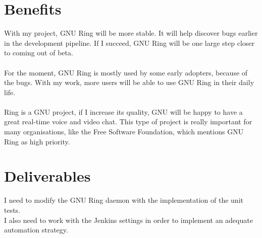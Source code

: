 \documentclass{article}
\begin{document}
\section{Benefits}
With my project, GNU Ring will be more stable. It will help discover bugs earlier in the development pipeline. If I succeed, GNU Ring will be one large step closer to coming out of beta.\\ \\
For the moment, GNU Ring is mostly used by some early adopters, because of the bugs. With my work, more users will be able to use GNU Ring in their daily life. \\ \\
Ring is a GNU project, if I increase its quality, GNU will be happy to have a great real-time voice and video chat. This type of project is really important for many organisations, like the Free Software Foundation, which mentions GNU Ring as high priority.

\section{Deliverables}
I need to modify the GNU Ring daemon with the implementation of the unit tests.\\
I also need to work with the Jenkins settings in order to implement an adequate automation strategy.
\end{document}
